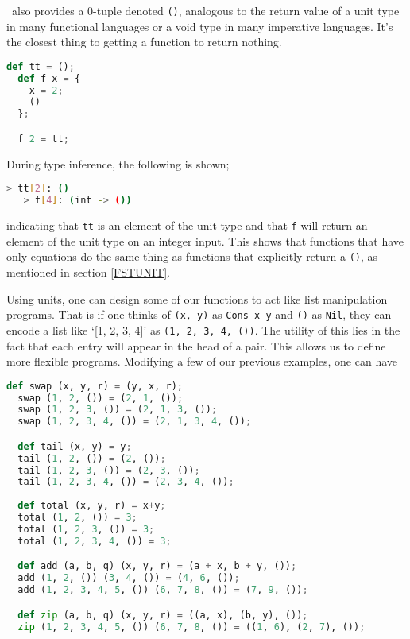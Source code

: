 \label{UNITEXP}
\vampir\ also provides a 0-tuple denoted \lstinline{()}, analogous to the return value of a unit type in many functional languages or a void type in many imperative languages. It's the closest thing to getting a function to return nothing.

\pagebreak

\begin{lstlisting}[language=Python]
  def tt = ();
  def f x = {
    x = 2;
    ()
  };

  f 2 = tt;
\end{lstlisting}

During type inference, the following is shown;

\begin{lstlisting}[language=bash]
   > tt[2]: ()
   > f[4]: (int -> ())
\end{lstlisting}

indicating that \lstinline{tt} is an element of the unit type and that \lstinline{f} will return an element of the unit type on an integer input. This shows that functions that have only equations do the same thing as functions that explicitly return a \lstinline{()}, as mentioned in section \ref{FSTUNIT}.

Using units, one can design some of our functions to act like list manipulation programs. That is if one thinks of \lstinline{(x, y)} as \lstinline{Cons x y} and \lstinline{()} as \lstinline{Nil}, they can encode a list like `[1, 2, 3, 4]' as \lstinline{(1, 2, 3, 4, ())}. The utility of this lies in the fact that each entry will appear in the head of a pair. This allows us to define more flexible programs. Modifying a few of our previous examples, one can have

\begin{lstlisting}[language=Python]
  def swap (x, y, r) = (y, x, r);
  swap (1, 2, ()) = (2, 1, ());
  swap (1, 2, 3, ()) = (2, 1, 3, ());
  swap (1, 2, 3, 4, ()) = (2, 1, 3, 4, ());

  def tail (x, y) = y;
  tail (1, 2, ()) = (2, ());
  tail (1, 2, 3, ()) = (2, 3, ());  
  tail (1, 2, 3, 4, ()) = (2, 3, 4, ());
  
  def total (x, y, r) = x+y;
  total (1, 2, ()) = 3;
  total (1, 2, 3, ()) = 3;  
  total (1, 2, 3, 4, ()) = 3;

  def add (a, b, q) (x, y, r) = (a + x, b + y, ());
  add (1, 2, ()) (3, 4, ()) = (4, 6, ());
  add (1, 2, 3, 4, 5, ()) (6, 7, 8, ()) = (7, 9, ());

  def zip (a, b, q) (x, y, r) = ((a, x), (b, y), ());
  zip (1, 2, 3, 4, 5, ()) (6, 7, 8, ()) = ((1, 6), (2, 7), ());
\end{lstlisting}

